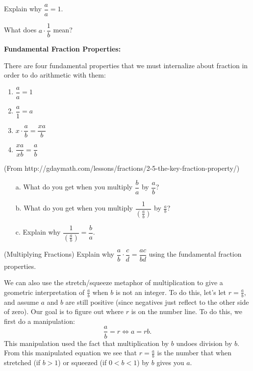 \begin{question}
Explain why $\dfrac{a}{a} = 1$.
\end{question}

\begin{question}
What does $a \cdot \dfrac{1}{b}$ mean?  
\end{question}
\vfill

\begin{tcolorbox}{\bf Fundamental Fraction Properties:}

There are four fundamental properties that we must internalize about fraction in order to do arithmetic with them:
\begin{enumerate}
\item $\dfrac{a}{a} = 1$
\item $\dfrac{a}{1} = a$
\item $x\cdot\dfrac{a}{b} = \dfrac{xa}{b}$
\item $\dfrac{xa}{xb} = \dfrac{a}{b}$
\end{enumerate}
\tiny{(From \ttfamily http://gdaymath.com/lessons/fractions/2-5-the-key-fraction-property/\normalfont)}
\end{tcolorbox}

\par

\begin{question} \begin{enumerate}
    \item[a.] What do you get when you multiply $\dfrac{b}{a}$ by $\dfrac{a}{b}$?  
    \item[b.] What do you get when you multiply $\dfrac{1}{\left(\frac  ab \right)}$ by $\frac{a}{b}$?  
    \item[c.] Explain why $\dfrac{1}{\left(\frac{a}{b}\right)} = \dfrac{b}{a}$. \end{enumerate}
\end{question}

\par

\begin{question}(Multiplying Fractions) Explain why $\dfrac{a}{b}\cdot\dfrac{c}{d} = \dfrac{ac}{bd}$ using the fundamental fraction properties. 
\end{question}

\par

We can also use the stretch/squeeze metaphor of multiplication to give a geometric interpretation of $\frac{a}{b}$ when $b$ is not an integer. To do this, let's let $r = \frac{a}{b}$, and assume $a$ and $b$ are still positive (since negatives just reflect to the other side of zero). Our goal is to figure out where $r$ is on the number line. To do this, we first  do a manipulation:
\[
\frac{a}{b} = r \Longleftrightarrow a = rb.
\]
This manipulation  used the fact that multiplication by $b$ undoes division by $b$. From this manipulated equation we see that $r = \frac{a}{b}$ is the number that when stretched (if $b>1$) or squeezed (if $0<b<1$) by $b$ gives you $a$.


